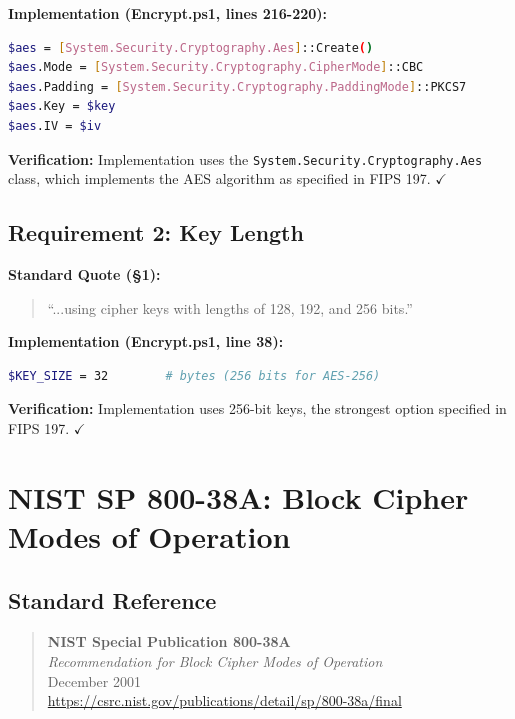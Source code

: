 \documentclass[11pt,letterpaper]{article}
\begin{document}
\begin{samepage}
\textbf{Implementation (Encrypt.ps1, lines 216-220):}
\begin{lstlisting}[language=bash]
$aes = [System.Security.Cryptography.Aes]::Create()
$aes.Mode = [System.Security.Cryptography.CipherMode]::CBC
$aes.Padding = [System.Security.Cryptography.PaddingMode]::PKCS7
$aes.Key = $key
$aes.IV = $iv
\end{lstlisting}
\textbf{Verification:} Implementation uses the \texttt{System.Security.Cryptography.Aes} class, which implements the AES algorithm as specified in FIPS 197. $\checkmark$
\end{samepage}

\subsection{Requirement 2: Key Length}

\textbf{Standard Quote (§1):}
\begin{quote}
``...using cipher keys with lengths of 128, 192, and 256 bits.''
\end{quote}

\begin{samepage}
\textbf{Implementation (Encrypt.ps1, line 38):}
\begin{lstlisting}[language=bash]
$KEY_SIZE = 32        # bytes (256 bits for AES-256)
\end{lstlisting}
\textbf{Verification:} Implementation uses 256-bit keys, the strongest option specified in FIPS 197. $\checkmark$
\end{samepage}

\newpage
\section{NIST SP 800-38A: Block Cipher Modes of Operation}

\subsection{Standard Reference}

\begin{quote}
\textbf{NIST Special Publication 800-38A} \\
\textit{Recommendation for Block Cipher Modes of Operation} \\
December 2001 \\
\url{https://csrc.nist.gov/publications/detail/sp/800-38a/final}
\end{quote}
\end{document}
